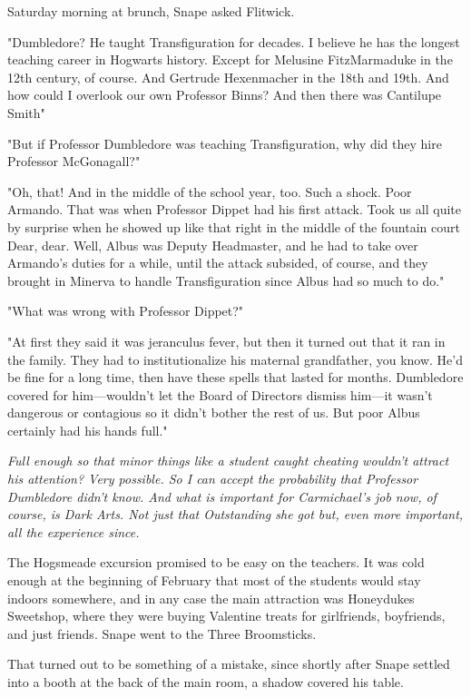 Saturday morning at brunch, Snape asked Flitwick.

"Dumbledore? He taught Transfiguration for decades. I believe he has the longest teaching career in Hogwarts history. Except for Melusine FitzMarmaduke in the 12th century, of course. And Gertrude Hexenmacher in the 18th and 19th. And how could I overlook our own Professor Binns? And then there was Cantilupe Smith{\el}"

"But if Professor Dumbledore was teaching Transfiguration, why did they hire Professor McGonagall?"

"Oh, that! And in the middle of the school year, too. Such a shock. Poor Armando. That was when Professor Dippet had his first attack. Took us all quite by surprise when he showed up like that right in the middle of the fountain court{\el} Dear, dear. Well, Albus was Deputy Headmaster, and he had to take over Armando's duties for a while, until the attack subsided, of course, and they brought in Minerva to handle Transfiguration since Albus had so much to do."

"What was wrong with Professor Dippet?"

"At first they said it was jeranculus fever, but then it turned out that it ran in the family. They had to institutionalize his maternal grandfather, you know. He'd be fine for a long time, then have these spells that lasted for months. Dumbledore covered for him—wouldn't let the Board of Directors dismiss him—it wasn't dangerous or contagious so it didn't bother the rest of us. But poor Albus certainly had his hands full."

\emph{Full enough so that minor things like a student caught cheating wouldn't attract his attention? Very possible. So I can accept the probability that Professor Dumbledore didn't know. And what is important for Carmichael's job now, of course, is Dark Arts. Not just that Outstanding she got but, even more important, all the experience since.}

The Hogsmeade excursion promised to be easy on the teachers. It was cold enough at the beginning of February that most of the students would stay indoors somewhere, and in any case the main attraction was Honeydukes Sweetshop, where they were buying Valentine treats for girlfriends, boyfriends, and just friends. Snape went to the Three Broomsticks.

That turned out to be something of a mistake, since shortly after Snape settled into a booth at the back of the main room, a shadow covered his table.

